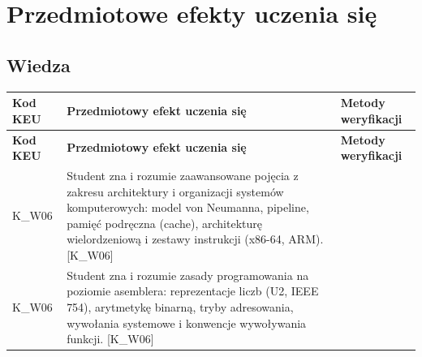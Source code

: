 \documentclass[12pt, a4paper]{article}
\newcommand{\thdrule}{\noalign{\global\setlength{\extrarowheight}{0pt}}}
\newcommand{\thdend}{\noalign{\global\setlength{\extrarowheight}{3pt}}}
\begin{document}
\section{Przedmiotowe efekty uczenia się}

\subsection*{Wiedza}
{\scriptsize
\begin{longtable}{m{1.6cm}m{9.0cm}m{4.2cm}}
\thdrule\toprule
\rowcolor{pjatkRed} {\color{white}\footnotesize\textbf{\vphantom{Ag}Kod KEU}} & {\color{white}\footnotesize\textbf{\vphantom{Ag}Przedmiotowy efekt uczenia się}} & {\color{white}\footnotesize\textbf{\vphantom{Ag}Metody weryfikacji}} \\
\midrule\thdend
\endfirsthead
\thdrule\toprule
\rowcolor{pjatkRed} {\color{white}\footnotesize\textbf{\vphantom{Ag}Kod KEU}} & {\color{white}\footnotesize\textbf{\vphantom{Ag}Przedmiotowy efekt uczenia się}} & {\color{white}\footnotesize\textbf{\vphantom{Ag}Metody weryfikacji}} \\
\midrule\thdend
\endhead
  \rowcolor{tableRowLight} K\_W06 & Student zna i rozumie zaawansowane pojęcia z zakresu architektury i organizacji systemów komputerowych: model von Neumanna, pipeline, pamięć podręczna (cache), architekturę wielordzeniową i zestawy instrukcji (x86-64, ARM). {[}K\_W06{]} &  \\
  \rowcolor{tableRowAlt} K\_W06 & Student zna i rozumie zasady programowania na poziomie asemblera: reprezentacje liczb (U2, IEEE 754), arytmetykę binarną, tryby adresowania, wywołania systemowe i konwencje wywoływania funkcji. {[}K\_W06{]} &  \\
\bottomrule
\end{longtable}}
\end{document}
